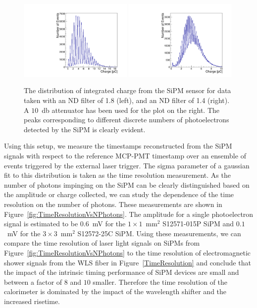 \begin{figure}[htbp] 
\centering
\includegraphics[width=0.49\textwidth]{figures/NPhotons1.pdf} 
\includegraphics[width=0.49\textwidth]{figures/NPhotons2.pdf} 
\caption{The distribution of integrated charge from the SiPM sensor for data 
taken with an ND filter of 1.8 (left), and an ND filter of 1.4 (right). 
A $10$~db attenuator has been used for the plot on the right. The peaks corresponding
to different discrete numbers of photoelectrons detected by the SiPM is clearly
evident.} 
\label{fig:NPhotonPeaks} 
\end{figure} 

Using this setup, we measure the timestamps reconstructed from the SiPM signals
with respect to the reference MCP-PMT timestamp over an ensemble of events
triggered by the external laser trigger. The sigma parameter of a gaussian fit
to this distribution is taken as the time resolution measurement.
As the number of photons impinging on the SiPM can be clearly distinguished 
based on the amplitude or charge collected, we can study the dependence of the 
time resolution on the number of photons. These measurements are shown in 
Figure~\ref{fig:TimeResolutionVsNPhotons}. The amplitude for a single
photoelectron signal is estimated to be $0.6$~mV for the $1\times1$~$\mathrm{mm}^{2}$ 
S12571-015P SiPM and $0.1$~mV for 
the $3\times 3$~$\mathrm{mm}^{2}$ S12572-25C SiPM. Using these 
measurements, we can compare the time resolution of laser light signals on
SiPMs from Figure~\ref{fig:TimeResolutionVsNPhotons} to the time resolution
of electromagnetic shower signals from the WLS fiber in Figure~\ref{TimeResolution}
and conclude that the impact of the intrinsic timing performance of 
SiPM devices are small and between a factor of $8$ and $10$ smaller. 
Therefore the time resolution of the calorimeter is dominated by the 
impact of the wavelength shifter and the increased risetime.




